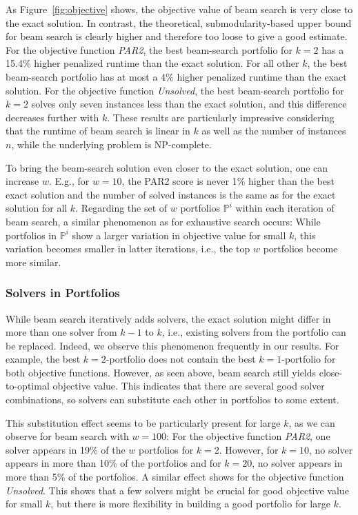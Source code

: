 \documentclass[conference]{IEEEtran}
\begin{document}
As Figure~\ref{fig:objective} shows, the objective value of beam search is very close to the exact solution.
In contrast, the theoretical, submodularity-based upper bound for beam search is clearly higher and therefore too loose to give a good estimate.
For the objective function \emph{PAR2}, the best beam-search portfolio for $k=2$ has a 15.4\% higher penalized runtime than the exact solution.
For all other $k$, the best beam-search portfolio has at most a 4\% higher penalized runtime than the exact solution.
For the objective function \emph{Unsolved}, the best beam-search portfolio for $k=2$ solves only seven instances less than the exact solution, and this difference decreases further with $k$.
These results are particularly impressive considering that the runtime of beam search is linear in $k$ as well as the number of instances $n$, while the underlying problem is NP-complete.

To bring the beam-search solution even closer to the exact solution, one can increase $w$.
E.g., for $w=10$, the PAR2 score is never 1\% higher than the best exact solution and the number of solved instances is the same as for the exact solution for all $k$.
Regarding the set of $w$ portfolios $\mathbb{P}^i$ within each iteration of beam search, a similar phenomenon as for exhaustive search occurs:
While portfolios in $\mathbb{P}^i$ show a larger variation in objective value for small $k$, this variation becomes smaller in latter iterations, i.e., the top $w$ portfolios become more similar.

\subsubsection{Solvers in Portfolios}

While beam search iteratively adds solvers, the exact solution might differ in more than one solver from $k-1$ to $k$, i.e., existing solvers from the portfolio can be replaced.
Indeed, we observe this phenomenon frequently in our results.
For example, the best $k=2$-portfolio does not contain the best $k=1$-portfolio for both objective functions.
However, as seen above, beam search still yields close-to-optimal objective value.
This indicates that there are several good solver combinations, so solvers can substitute each other in portfolios to some extent.

This substitution effect seems to be particularly present for large $k$, as we can observe for beam search with $w=100$:
For the objective function \emph{PAR2}, one solver appears in 19\% of the $w$ portfolios for $k=2$.
However, for $k=10$, no solver appears in more than 10\% of the portfolios and for $k=20$, no solver appears in more than 5\% of the portfolios.
A similar effect shows for the objective function \emph{Unsolved}.
This shows that a few solvers might be crucial for good objective value for small $k$, but there is more flexibility in building a good portfolio for large $k$.
\end{document}
